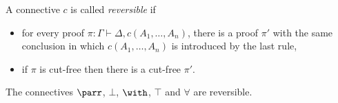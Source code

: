 \begin{definition}[reversibility]
A connective $c$ is called \textit{reversible} if
\begin{itemize}
\item for every proof $\pi:\Gamma\vdash\Delta,c(A_1,\ldots,A_n)$, there is a proof $\pi'$ with the same conclusion in which $c(A_1,\ldots,A_n)$ is introduced by the last rule,
\item if $\pi$ is cut-free then there is a cut-free $\pi'$.
\end{itemize}
\end{definition}

\begin{proposition}
The connectives $\parr$, $\bot$, $\with$, $\top$ and $\forall$ are reversible.
\end{proposition}

